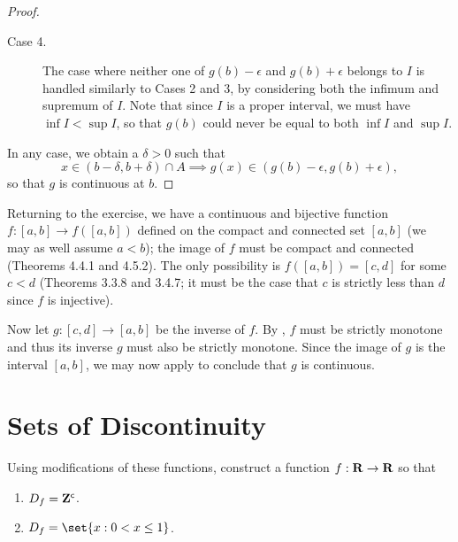 \documentclass{lew98_solutions}
\begin{document}
\begin{solution}
\begin{proof}
\begin{description}
            \item[Case 4.] The case where neither one of \( g(b) - \epsilon \) and \( g(b) + \epsilon \) belongs to \( I \) is handled similarly to Cases 2 and 3, by considering both the infimum and supremum of \( I \). Note that since \( I \) is a proper interval, we must have \( \inf I < \sup I \), so that \( g(b) \) could never be equal to both \( \inf I \) and \( \sup I \).
        \end{description}

        In any case, we obtain a \( \delta > 0 \) such that
        \[
            x \in (b - \delta, b + \delta) \cap A \implies g(x) \in (g(b) - \epsilon, g(b) + \epsilon),
        \]
        so that \( g \) is continuous at \( b \).
    \end{proof}

    Returning to the exercise, we have a continuous and bijective function \( f : [a, b] \to f([a, b]) \) defined on the compact and connected set \( [a, b] \) (we may as well assume \( a < b \)); the image of \( f \) must be compact and connected (Theorems 4.4.1 and 4.5.2). The only possibility is \( f([a, b]) = [c, d] \) for some \( c < d \) (Theorems 3.3.8 and 3.4.7; it must be the case that \( c \) is strictly less than \( d \) since \( f \) is injective).

    Now let \( g : [c, d] \to [a, b] \) be the inverse of \( f \). By , \( f \) must be strictly monotone and thus its inverse \( g \) must also be strictly monotone. Since the image of \( g \) is the interval \( [a, b] \), we may now apply  to conclude that \( g \) is continuous.
\end{solution}

\section{Sets of Discontinuity}
\label{sec:4.6}

\begin{exercise}
\label{ex:4.6.1}
    Using modifications of these functions, construct a function \( f : \mathbf{R} \to \mathbf{R} \) so that
    \begin{enumerate}
        \item \( D_f = \mathbf{Z}^{\mathsf{c}} \).

        \item \( D_f = \set{x : 0 < x \leq 1} \).
    \end{enumerate}
\end{exercise}
\end{document}
